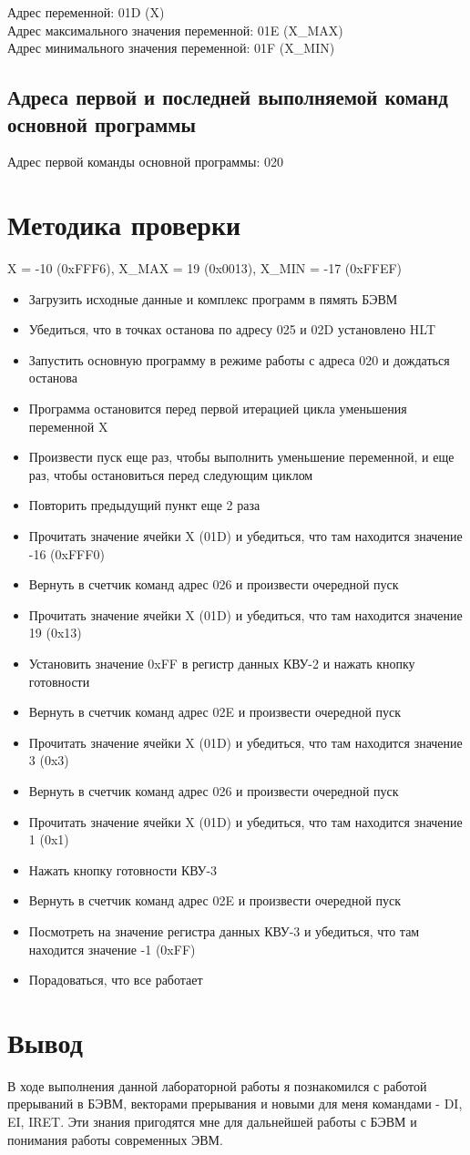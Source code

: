 \noindent Адрес переменной: 01D (X)\\
Адрес максимального значения переменной: 01E (X\_MAX)\\
Адрес минимального значения переменной: 01F (X\_MIN)

\subsection{Адреса первой и последней выполняемой команд основной программы}
\noindent Адрес первой команды основной программы: 020\\

\section{Методика проверки}
X = -10 (0xFFF6), X\_MAX = 19 (0x0013), X\_MIN = -17 (0xFFEF)
\begin{itemize}
\item Загрузить исходные данные и комплекс программ в пямять БЭВМ
\item Убедиться, что в точках останова по адресу 025 и 02D установлено HLT
\item Запустить основную программу в режиме работы с адреса 020 и дождаться останова
\item Программа остановится перед первой итерацией цикла уменьшения переменной X
\item Произвести пуск еще раз, чтобы выполнить уменьшение переменной, и еще раз, чтобы остановиться перед следующим циклом
\item Повторить предыдущий пункт еще 2 раза
\item Прочитать значение ячейки X (01D) и убедиться, что там находится значение -16 (0xFFF0)
\item Вернуть в счетчик команд адрес 026 и произвести очередной пуск
\item Прочитать значение ячейки X (01D) и убедиться, что там находится значение 19 (0x13)
\item Установить значение 0xFF в регистр данных КВУ-2 и нажать кнопку готовности
\item Вернуть в счетчик команд адрес 02E и произвести очередной пуск
\item Прочитать значение ячейки X (01D) и убедиться, что там находится значение 3 (0x3)
\item Вернуть в счетчик команд адрес 026 и произвести очередной пуск
\item Прочитать значение ячейки X (01D) и убедиться, что там находится значение 1 (0x1)
\item Нажать кнопку готовности КВУ-3
\item Вернуть в счетчик команд адрес 02E и произвести очередной пуск
\item Посмотреть на значение регистра данных КВУ-3 и убедиться, что там находится значение -1 (0xFF)
\item Порадоваться, что все работает
\end{itemize}

\section{Вывод}
В ходе выполнения данной лабораторной работы я познакомился с работой прерываний в БЭВМ, векторами прерывания и новыми для меня командами - DI, EI, IRET. Эти знания пригодятся мне для дальнейшей работы с БЭВМ и понимания работы современных ЭВМ.
